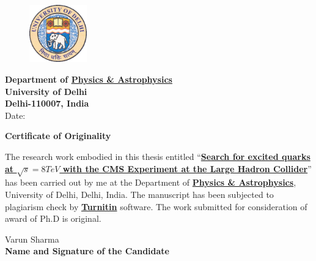 
\begin{titlepage}

\begin{figure}[!h]
\raggedright
\includegraphics[width=2.5cm,height=2.5cm]{du_logo_v3.png}
\end{figure}

\vspace{-4cm}
\hspace*{-1cm}
\begin{flushright}
{\color{blue}\textbf{\large{Department of \underline{Physics \& Astrophysics}}}}\\
{\color{gray}\textbf{University of Delhi}} \\
{\color{gray}\textbf{Delhi-110007, India}} \\
\vspace{3cm}
Date:\underline{\hspace{2.5cm}}
\end{flushright}



\vspace*{10mm}
\begin{center}
\textbf{\Large Certificate of Originality}
\end{center}

\doublespacing
The research work embodied in this thesis entitled ``\ul{\bf Search for excited quarks at $\sqrt{s} = 8\unit{TeV}$ with the CMS Experiment at the Large 
Hadron Collider}'' has been carried out by me at the Department of \ul{\bf Physics \& Astrophysics}, University of Delhi, Delhi, India. The manuscript has 
been subjected to plagiarism check by \underline{\bf Turnitin} software. The work submitted for consideration of award of Ph.D is original.

\vspace*{20mm}
\begin{flushright}
{\large Varun Sharma} \\
\textbf{Name and Signature of the Candidate}
\end{flushright}


\end{titlepage}
